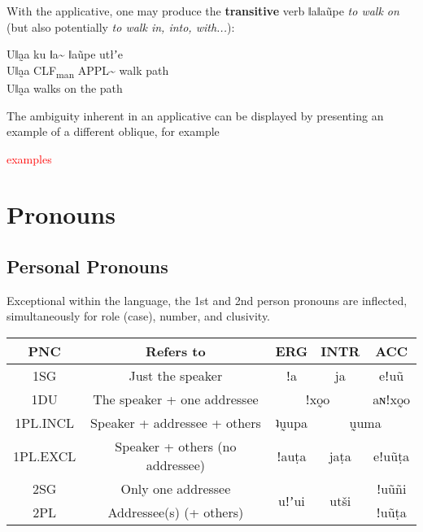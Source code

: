\documentclass[11pt,a5paper]{book}
\newcommand{\qcn}[1]{\textcolor{AccentText}{\large#1}}
\newcommand{\transl}[2]{\qcn{#1} \emph{#2}}
\newcommand{\grammsc}[1]{\textsc{#1}}
\newcommand{\CLF}[1]{\grammsc{CLF}\textsubscript{#1}}
\newcommand{\ERG}{\grammsc{ERG}}
\newcommand{\ACC}{\grammsc{ACC}}
\newcommand{\INTR}{\grammsc{INTR}}
\newcommand{\cmnt}[1]{\textcolor{red}{#1}}
\begin{document}
With the applicative, one may produce the \textbf{transitive} verb \transl{ǁaǁaũpe}{to walk on} (but also potentially \transl{}{to walk in, into, with...}):

\begin{exe}
\ex
\gll Uǁa̰a ku ǁa\textasciitilde{} ǁaũpe utłʼe \\
Uǁa̰a \CLF{man} APPL\textasciitilde{} walk path \\
\glt Uǁa̰a walks on the path
\end{exe}

The ambiguity inherent in an applicative can be displayed by presenting an example of a different oblique, for example

\cmnt{examples}

\section{Pronouns}


\subsection{Personal Pronouns}

Exceptional within the language, the 1st and 2nd person pronouns are inflected, simultaneously for role (case), number, and clusivity.

\begin{center}
\begin{tabular}{|c|c|c|c|c|}
\hline
PNC & Refers to & \ERG & \INTR & \ACC \\ \hline \hline
1SG & Just the speaker &\qcn{ǃa} & \qcn{ja} & \qcn{eǃuũ}\\ \hline
1DU & The speaker + one addressee & \multicolumn{2}{c|}{\qcn{ǃxo̰o}} & \qcn{aɴǃxo̰o} \\ \hline
1PL.INCL & Speaker + addressee + others & \qcn{ʇṵupa} & \multicolumn{2}{c|}{\qcn{ṵuma}} \\ \hline
1PL.EXCL & Speaker + others (no addressee) &\qcn{ǃauṭa} & \qcn{jaṭa} & \qcn{eǃuũṭa}\\ \hline
2SG & Only one addressee &\multirow{2}{*}{\qcn{uǃʼui}} & \multirow{2}{*}{\qcn{utši}} & \qcn{ǃuũñi}\\ \cline{1-2} \cline{5-5}
2PL & Addressee(s) (+ others) &  &  & \qcn{ǃuũṭa}\\\hline
\end{tabular}
\end{center}
\end{document}
